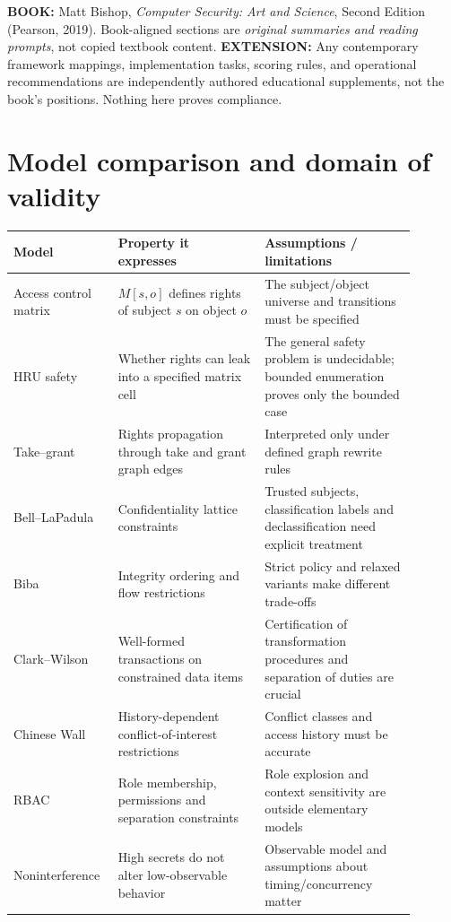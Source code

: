 \documentclass[10pt,letterpaper]{article}
\begin{document}
\makedoctocpage
\begin{notebox}
\textbf{BOOK:} Matt Bishop, \emph{Computer Security: Art and Science}, Second Edition (Pearson, 2019). Book-aligned sections are \emph{original summaries and reading prompts}, not copied textbook content.
\textbf{EXTENSION:} Any contemporary framework mappings, implementation tasks, scoring rules, and operational recommendations are independently authored educational supplements, not the book's positions. Nothing here proves compliance.
\end{notebox}
\section{Model comparison and domain of validity}
\begin{longtable}{@{}p{0.20\linewidth}p{0.34\linewidth}p{0.35\linewidth}@{}}
\toprule Model & Property it expresses & Assumptions / limitations\\\midrule\endhead
Access control matrix & $M[s,o]$ defines rights of subject $s$ on object $o$ & The subject/object universe and transitions must be specified\\
HRU safety & Whether rights can leak into a specified matrix cell & The general safety problem is undecidable; bounded enumeration proves only the bounded case\\
Take--grant & Rights propagation through take and grant graph edges & Interpreted only under defined graph rewrite rules\\
Bell--LaPadula & Confidentiality lattice constraints & Trusted subjects, classification labels and declassification need explicit treatment\\
Biba & Integrity ordering and flow restrictions & Strict policy and relaxed variants make different trade-offs\\
Clark--Wilson & Well-formed transactions on constrained data items & Certification of transformation procedures and separation of duties are crucial\\
Chinese Wall & History-dependent conflict-of-interest restrictions & Conflict classes and access history must be accurate\\
RBAC & Role membership, permissions and separation constraints & Role explosion and context sensitivity are outside elementary models\\
Noninterference & High secrets do not alter low-observable behavior & Observable model and assumptions about timing/concurrency matter\\\bottomrule
\end{longtable}
\end{document}
